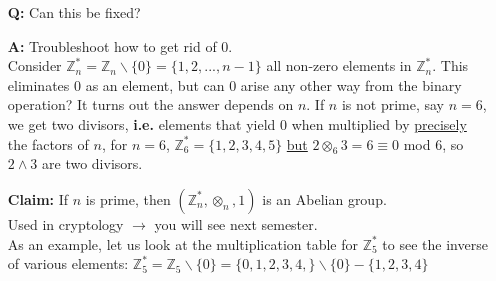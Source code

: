 \documentclass[10pt]{article}
\begin{document}
\begin{description}
\begin{enumerate}
			\item[\textbf{Q:}] Can this be fixed?
			\item[\textbf{A:}] Troubleshoot how to get rid of 0. \\
			Consider $\mathbb{Z}_n^* = \mathbb{Z}_n \backslash \{0\} = \{1, 2, ..., n-1\}$ all non-zero elements in $\mathbb{Z}_n^*$. This eliminates 0 as an element, but can 0 arise any other way from the binary operation? It turns out the answer depends on $n$. If $n$ is not prime, say $n=6$, we get two divisors, \textbf{i.e.} elements that yield 0 when multiplied by \underline{precisely} the factors of $n$, for $n=6$, $\mathbb{Z}^*_6 = \{1, 2, 3, 4, 5\}$ \underline{but} $2 \otimes _6 3 = 6 \equiv 0$ mod $6$, so $2 \land 3$ are two divisors.
			\item[\textbf{Claim:}] If $n$ is prime, then $(\mathbb{Z}_n^*, \otimes _n, 1)$ is an Abelian group. \\
			Used in cryptology $\rightarrow$ you will see next semester. \\
			As an example, let us look at the multiplication table for $\mathbb{Z}_5^*$ to see the inverse of various elements: $\mathbb{Z}^*_5 = \mathbb{Z}_5 \backslash \{0\} = \{0, 1, 2, 3, 4,\} \backslash \{0\} - \{1, 2, 3, 4\}$
	

\end{enumerate}
\end{description}
\end{document}
